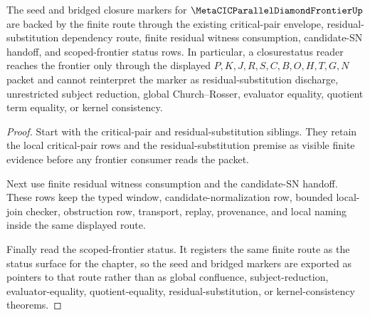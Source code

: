 \begin{theorem}
\label{thm:metacic-parallel-diamond-frontier-closurestatus-export}
The seed and bridged closure markers for $\MetaCICParallelDiamondFrontierUp$ are backed by the finite route through the existing critical-pair envelope, residual-substitution dependency route, finite residual witness consumption, candidate-SN handoff, and scoped-frontier status rows. In particular, a closurestatus reader reaches the frontier only through the displayed $P,K,J,R,S,C,B,O,H,T,G,N$ packet and cannot reinterpret the marker as residual-substitution discharge, unrestricted subject reduction, global Church--Rosser, evaluator equality, quotient term equality, or kernel consistency.
\end{theorem}
\begin{proof}
Start with the critical-pair and residual-substitution siblings. They retain the local critical-pair rows and the residual-substitution premise as visible finite evidence before any frontier consumer reads the packet.

Next use finite residual witness consumption and the candidate-SN handoff. These rows keep the typed window, candidate-normalization row, bounded local-join checker, obstruction row, transport, replay, provenance, and local naming inside the same displayed route.

Finally read the scoped-frontier status. It registers the same finite route as the status surface for the chapter, so the seed and bridged markers are exported as pointers to that route rather than as global confluence, subject-reduction, evaluator-equality, quotient-equality, residual-substitution, or kernel-consistency theorems.
\end{proof}

